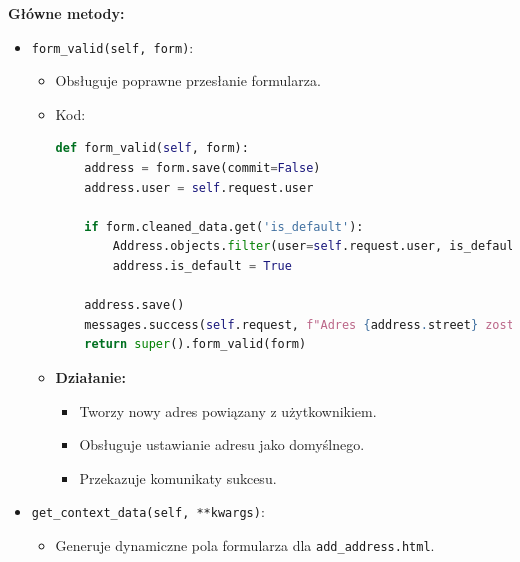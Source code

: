 \documentclass[12pt,a4paper,oneside]{article}
\theoremstyle{definition}
\numberwithin{equation}{section}
\begin{document}
\textbf{Główne metody:}
\begin{itemize}
    \item \texttt{form\_valid(self, form)}:
    \begin{itemize}
        \item Obsługuje poprawne przesłanie formularza.
        \item Kod:
        \begin{lstlisting}[language=Python, caption=Metoda \texttt{form\_valid} w \texttt{UserAddressCreationView}]
def form_valid(self, form):
    address = form.save(commit=False)
    address.user = self.request.user

    if form.cleaned_data.get('is_default'):
        Address.objects.filter(user=self.request.user, is_default=True).update(is_default=False)
        address.is_default = True

    address.save()
    messages.success(self.request, f"Adres {address.street} zostal zapisany.")
    return super().form_valid(form)
        \end{lstlisting}
    \item \textbf{Działanie:}
    \begin{itemize}
        \item Tworzy nowy adres powiązany z użytkownikiem.
        \item Obsługuje ustawianie adresu jako domyślnego.
        \item Przekazuje komunikaty sukcesu.
    \end{itemize}
    \end{itemize}
    \item \texttt{get\_context\_data(self, **kwargs)}:
    \begin{itemize}
        \item Generuje dynamiczne pola formularza dla \texttt{add\_address.html}.
    \end{itemize}
\end{itemize}
\end{document}
